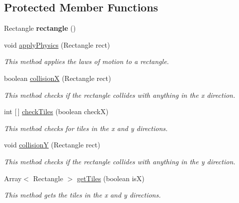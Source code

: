 \subsection*{Protected Member Functions}
\begin{DoxyCompactItemize}
\item 
\mbox{\label{classnl_1_1arjanfrans_1_1mario_1_1model_1_1MovingActor_a87133b03c2a4fd28db5d0b59f939a592}} 
Rectangle {\bfseries rectangle} ()
\item 
void \hyperlink{classnl_1_1arjanfrans_1_1mario_1_1model_1_1MovingActor_ab728cb879f42b81b171fda3ecb85260b}{apply\+Physics} (Rectangle rect)
\begin{DoxyCompactList}\small\item\em This method applies the laws of motion to a rectangle. \end{DoxyCompactList}\item 
boolean \hyperlink{classnl_1_1arjanfrans_1_1mario_1_1model_1_1MovingActor_a58d1642a39909c7f838dd84b2fb6c506}{collisionX} (Rectangle rect)
\begin{DoxyCompactList}\small\item\em This method checks if the rectangle collides with anything in the x direction. \end{DoxyCompactList}\item 
int \mbox{[}$\,$\mbox{]} \hyperlink{classnl_1_1arjanfrans_1_1mario_1_1model_1_1MovingActor_a782d932e0ff4b3b99de0542892d671c2}{check\+Tiles} (boolean checkX)
\begin{DoxyCompactList}\small\item\em This method checks for tiles in the x and y directions. \end{DoxyCompactList}\item 
void \hyperlink{classnl_1_1arjanfrans_1_1mario_1_1model_1_1MovingActor_acd9c3910d87bd94574b28599b7bc89db}{collisionY} (Rectangle rect)
\begin{DoxyCompactList}\small\item\em This method checks if the rectangle collides with anything in the y direction. \end{DoxyCompactList}\item 
Array$<$ Rectangle $>$ \hyperlink{classnl_1_1arjanfrans_1_1mario_1_1model_1_1MovingActor_a1aaf050e3c58bc9c523ccc6cefeabaf4}{get\+Tiles} (boolean isX)
\begin{DoxyCompactList}\small\item\em This method gets the tiles in the x and y directions. \end{DoxyCompactList}\item 

\end{DoxyCompactItemize}
